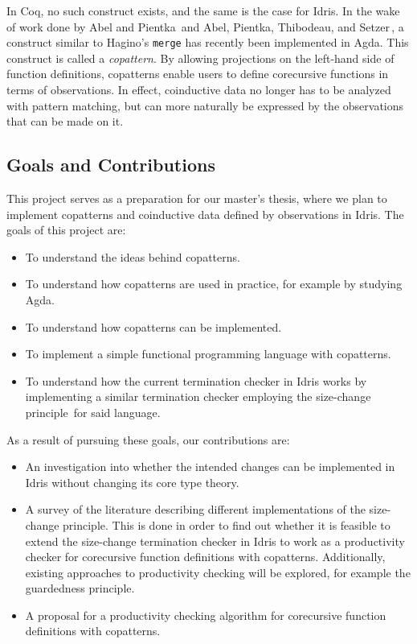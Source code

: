 In Coq, no such construct exists, and the same is the case for Idris. In the wake of work done by Abel and Pientka\,\citep{Abel13Wellfounded} and Abel, Pientka, Thibodeau, and Setzer\,\citep{Abel13Copatterns}, a construct similar to Hagino's \texttt{merge} has recently been implemented in Agda. This construct is called a \emph{copattern}. By allowing projections on the left-hand side of function definitions, copatterns enable users to define corecursive functions in terms of observations. In effect, coinductive data no longer has to be analyzed with pattern matching, but can more naturally be expressed by the observations that can be made on it. 

\subsection{Goals and Contributions}
This project serves as a preparation for our master's thesis, where we plan to implement copatterns and coinductive data defined by observations in Idris. The goals of this project are:

\begin{itemize}
\item To understand the ideas behind copatterns.
\item To understand how copatterns are used in practice, for example by studying Agda.
\item To understand how copatterns can be implemented.
\item To implement a simple functional programming language with copatterns.
\item To understand how the current termination checker in Idris works by implementing a similar termination checker employing the size-change principle\,\citep{LeeJones01SizeChange} for said language.
\end{itemize}

As a result of pursuing these goals, our contributions are:

\begin{itemize}
\item An investigation into whether the intended changes can be implemented in Idris without changing its core type theory.
\item A survey of the literature describing different implementations of the size-change principle. This is done in order to find out whether it is feasible to extend the size-change termination checker in Idris to work as a productivity checker for corecursive function definitions with copatterns. Additionally, existing approaches to productivity checking will be explored, for example the guardedness principle.
\item A proposal for a productivity checking algorithm for corecursive function definitions with copatterns.
\end{itemize} 


